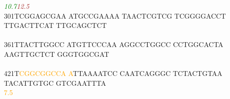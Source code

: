 \documentclass[11pt,twoside,reqno,a4paper]{article}
\begin{document}
{\hspace*{4\charwidth}\hspace*{2\charwidth}\textit{\textcolor{green}{10.7}}\hspace*{1\charwidth}\hspace*{1\charwidth}\hspace*{1\charwidth}\hspace*{26\charwidth}\textit{\textcolor{brown}{12.5}}\hspace*{1\charwidth}\hspace*{1\charwidth}\hspace*{1\charwidth}\\
301\hspace*{1\charwidth}TCGGAGCGAA	ATGCCGAAAA	TAACTCGTCG	TCGGGGACCT	TTGACTTCAT	TTGCAGCTCT	\\
\hspace*{4\charwidth}\hspace*{1\charwidth}\hspace*{1\charwidth}\hspace*{1\charwidth}\hspace*{1\charwidth}\hspace*{1\charwidth}\hspace*{1\charwidth}\\
361\hspace*{1\charwidth}TTACTTGGCC	ATGTTCCCAA	AGGCCTGGCC	CCTGGCACTA	AAGTTGCTCT	GGGTGGCGAT	\\
\hspace*{4\charwidth}\hspace*{1\charwidth}\hspace*{1\charwidth}\hspace*{1\charwidth}\hspace*{1\charwidth}\hspace*{1\charwidth}\hspace*{1\charwidth}\\
421\hspace*{1\charwidth}T\textcolor{orange}{C}\textcolor{orange}{G}\textcolor{orange}{G}\textcolor{orange}{C}\textcolor{orange}{G}\textcolor{orange}{G}\textcolor{orange}{C}\textcolor{orange}{C}\textcolor{orange}{A}	\textcolor{orange}{A}TTAAAATCC	CAATCAGGGC	TCTACTGTAA	TACATTGTGC	GTCGAATTTA	\\
\hspace*{4\charwidth}\hspace*{1\charwidth}\textcolor{orange}{7.5}\hspace*{1\charwidth}\hspace*{1\charwidth}\hspace*{1\charwidth}\hspace*{1\charwidth}\hspace*{1\charwidth}\hspace*{1\charwidth}\\
}
\end{document}
